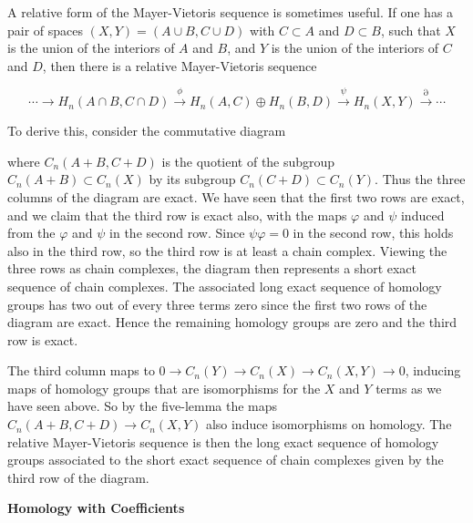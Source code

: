 A relative form of the Mayer-Vietoris sequence is sometimes useful. If one has a pair of spaces $(X, Y) = (A \cup B, C \cup D)$ with $C \subset A$ and $D \subset B$, such that $X$ is the union of the interiors of $A$ and $B$, and $Y$ is the union of the interiors of $C$ and $D$, then there is a relative Mayer-Vietoris sequence

\[
\cdots \to H_n(A \cap B, C \cap D) \xrightarrow{\phi} H_n(A, C) \oplus H_n(B, D) \xrightarrow{\psi} H_n(X, Y) \xrightarrow{\partial} \cdots
\]

To derive this, consider the commutative diagram



where $C_n(A + B, C + D)$ is the quotient of the subgroup $C_n(A + B) \subset C_n(X)$ by its subgroup $C_n(C + D) \subset C_n(Y)$. Thus the three columns of the diagram are exact. We have seen that the first two rows are exact, and we claim that the third row is exact also, with the maps $\varphi$ and $\psi$ induced from the $\varphi$ and $\psi$ in the second row. Since $\psi \varphi = 0$ in the second row, this holds also in the third row, so the third row is at least a chain complex. Viewing the three rows as chain complexes, the diagram then represents a short exact sequence of chain complexes. The associated long exact sequence of homology groups has two out of every three terms zero since the first two rows of the diagram are exact. Hence the remaining homology groups are zero and the third row is exact.

The third column maps to $0 \to C_n(Y) \to C_n(X) \to C_n(X,Y) \to 0$, inducing maps of homology groups that are isomorphisms for the $X$ and $Y$ terms as we have seen above. So by the five-lemma the maps $C_n(A+B, C+D) \to C_n(X,Y)$ also induce isomorphisms on homology. The relative Mayer-Vietoris sequence is then the long exact sequence of homology groups associated to the short exact sequence of chain complexes given by the third row of the diagram.

\textbf{Homology with Coefficients}

